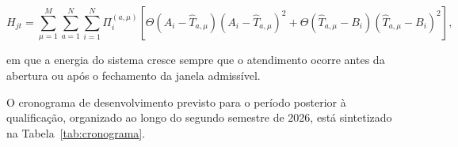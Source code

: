 \begin{equation}
H_{jt} = \sum_{\mu=1}^{M} \sum_{a=1}^{N} \sum_{i=1}^{N} 
\Pi^{(a,\mu)}_i \left[\Theta\left(A_i - \hat{T}_{a,\mu}\right) 
\left(A_i - \hat{T}_{a,\mu}\right)^2 + \Theta\left(\hat{T}_{a,\mu} 
- B_i\right)\left(\hat{T}_{a,\mu} - B_i\right)^2\right],
\end{equation}

\noindent em que a energia do sistema cresce sempre que o atendimento ocorre antes da abertura ou após o fechamento da janela admissível.

O cronograma de desenvolvimento previsto para o período posterior à qualificação, organizado ao longo do segundo semestre de 2026, está sintetizado na Tabela~\ref{tab:cronograma}.

    \begin{table}[!htb]
    \centering
    \caption{Cronograma de execução das atividades}
    \label{tab:cronograma}
    \end{table}

    